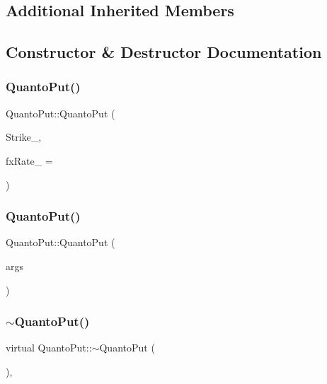 \subsection*{Additional Inherited Members}


\subsection{Constructor \& Destructor Documentation}
\hypertarget{classQuantoPut_ad3f3ade278eb64e7327523f4c8454ceb}{}\label{classQuantoPut_ad3f3ade278eb64e7327523f4c8454ceb} 
\subsubsection{\texorpdfstring{Quanto\+Put()}{QuantoPut()}\hspace{0.1cm}{\footnotesize\ttfamily [1/2]}}
{\footnotesize\ttfamily Quanto\+Put\+::\+Quanto\+Put (\begin{DoxyParamCaption}\item[{double}]{Strike\+\_\+,  }\item[{double}]{fx\+Rate\+\_\+ = {} }\end{DoxyParamCaption})}

\hypertarget{classQuantoPut_ad153cb9f172e6afa3fd6a7e6d9eb087a}{}\label{classQuantoPut_ad153cb9f172e6afa3fd6a7e6d9eb087a} 
\subsubsection{\texorpdfstring{Quanto\+Put()}{QuantoPut()}\hspace{0.1cm}{\footnotesize\ttfamily [2/2]}}
{\footnotesize\ttfamily Quanto\+Put\+::\+Quanto\+Put (\begin{DoxyParamCaption}\item[{const \hyperlink{classMJArray}{M\+J\+Array} \&}]{args }\end{DoxyParamCaption})}

\hypertarget{classQuantoPut_a2c07de96ba733c2963001cd9dc98ac94}{}\label{classQuantoPut_a2c07de96ba733c2963001cd9dc98ac94} 
\subsubsection{\texorpdfstring{$\sim$\+Quanto\+Put()}{~QuantoPut()}}
{\footnotesize\ttfamily virtual Quanto\+Put\+::$\sim$\+Quanto\+Put (\begin{DoxyParamCaption}{ }\end{DoxyParamCaption})\hspace{0.3cm}{\ttfamily [inline]}, {\ttfamily [virtual]}}



